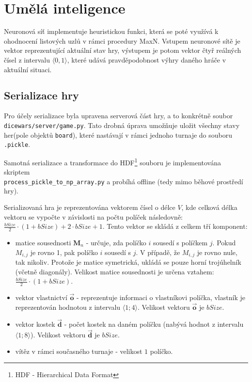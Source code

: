 \documentclass[a4paper, 11pt]{article}
\begin{document}
\section{Umělá inteligence}

Neuronová síť implementuje heuristickou funkci, která se poté využívá k ohodnocení listových uzlů v rámci procedury MaxN. Vstupem neuronové sítě je vektor reprezentující aktuální stav hry, výstupem je potom vektor čtyř reálných čísel z intervalu $\langle 0,1 \rangle$, které udává pravděpodobnost výhry daného hráče v aktuální situaci.


\subsection{Serializace hry}
Pro účely serializace byla upravena serverová část hry, a to konkrétně soubor \texttt{dicewars/server/game.py}. Tato drobná úprava umožňuje uložit všechny stavy her(pole objektů \texttt{board}), které nastávají v rámci jednoho turnaje do souboru \texttt{.pickle}.

Samotná serializace a transformace do HDF\footnote{HDF - Hierarchical Data Format} souboru je implementována skriptem\\\texttt{process\_pickle\_to\_np\_array.py} a probíhá offline (tedy mimo běhové prostředí hry).

Serializovaná hra je reprezentována vektorem čísel o délce $V$, kde celková délka vektoru se vypočte v závislosti na počtu políček následovně: $\frac{bSize}{2} \cdot (1+bSize) + 2 \cdot bSize + 1$. Tento vektor se skládá z celkem tří komponent: 
\begin{itemize}
	\item matice sousednosti $\bm{M}_{n}$ - určuje, zda políčko $i$ sousedí s políčkem $j$. Pokud \textit{$M_{i,j}$} je rovno 1, pak políčko $i$ sousedí s $j$. V případě, že \textit{$M_{i,j}$} je rovno nule, tak nikoliv. Protože je matice symetrická, ukládá se pouze horní trojúhelník (včetně diagonály). Velikost matice sousednosti je určena vztahem: $\frac{bSize}{2} \cdot (1+bSize)$.
	\item vektor vlastnictví $\bm{\vec{o}}$ - reprezentuje informaci o vlastníkovi políčka, vlastník je reprezentován hodnotou z intervalu $\langle 1;4 \rangle$. Velikost vektoru $\bm{\vec{o}}$ je $bSize$.
	\item vektor kostek $\bm{\vec{d}}$ - počet kostek na daném políčku (nabývá hodnot z intervalu $\langle 1;8 \rangle$).  Velikost vektoru $\bm{\vec{d}}$ je $bSize$.
	\item vítěz v rámci současného turnaje - velikost $1$ políčko.
\end{itemize}
\end{document}
